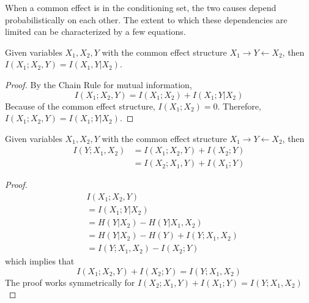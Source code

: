 \documentclass[../thesis.tex]{subfiles}
\begin{document}
When a common effect is in the conditioning set,
the two causes depend probabilistically on each other.
The extent to which these dependencies are limited can
be characterized by a few equations.

\begin{lem}
  \label{lemma:common-effect-1}
  Given variables $X_1,X_2,Y$ with
  the common effect structure $X_1 \rightarrow Y \leftarrow X_2$,
  then $I(X_1;X_2,Y) = I(X_1,Y \vert X_2)$.
\end{lem}
\begin{proof}
  By the Chain Rule for mutual information,
  $$I(X_1;X_2,Y) = I(X_1;X_2) + I(X_1;Y \vert X_2)$$
  Because of the common effect structure, $I(X_1;X_2) = 0$.
  Therefore, $I(X_1;X_2,Y) = I(X_1;Y \vert X_2)$.
\end{proof}

\begin{lem}
  \label{lemma:common-effect-2}
  Given variables $X_1,X_2,Y$ with
  the common effect structure $X_1 \rightarrow Y \leftarrow X_2$,
  then
  \begin{equation}
    \begin{split}
      I(Y; X_1, X_2) & = I(X_1;X_2,Y) + I(X_2;Y) \\
      & = I(X_2;X_1,Y) + I(X_1;Y)
    \end{split}
  \end{equation}
\end{lem}
\begin{proof}
  \begin{equation}
    \begin{split}
      & I(X_1;X_2,Y) \\
      & = I(X_1;Y \vert X_2) \\
      & = H(Y \vert X_2) - H(Y \vert X_1, X_2)\\
      & = H(Y \vert X_2) - H(Y) + I(Y ; X_1, X_2)\\
      & = I(Y ; X_1, X_2) - I(X_2;Y)
    \end{split}
  \end{equation}
  which implies that
  $$I(X_1;X_2,Y) + I(X_2;Y) = I(Y ; X_1, X_2)$$
  The proof works symmetrically for
  $I(X_2;X_1,Y) + I(X_1;Y) = I(Y ; X_1, X_2)$
\end{proof}
\end{document}
